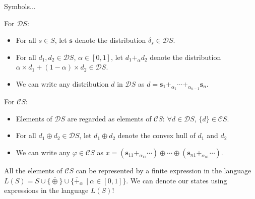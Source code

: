 \documentclass{beamer}
\newcommand{\C}{\mathcal C}
\begin{document}
\begin{frame}{Symbols...}
 \begin{block}{For $\mathcal D S$:}
\begin{itemize}
    \item For all $s \in S$, let $\mathbf s$ denote the distribution $\delta_s \in \mathcal D S$.  \pause
    \item For all $d_1, d_2 \in \mathcal D S$, $\alpha \in [0,1]$, let $d_1 +_\alpha d_2$ denote the distribution $\alpha \times d_1 + (1-\alpha) \times d_2 \in \mathcal D S$. \pause %
    \item[\MVRightarrow] We can write any distribution $d$ in $\mathcal D S$ as $d = \mathbf s_1 +_{\alpha_1} \cdots +_{\alpha_{n-1}} \mathbf s_n$. \pause
    \end{itemize}
    \end{block}
    
    \begin{block}{For $\C S$:}
    \begin{itemize}
    \item Elements of $\mathcal D S$ are regarded as elements of $\mathcal C S$: $\forall d \in \mathcal DS$, $\{d\} \in \mathcal CS$.\pause
    \item For all $d_1 \oplus d_2 \in \mathcal D S$, let $d_1 \oplus d_2$ denote the convex hull of $d_1$ and $d_2$ \pause
    \item[\MVRightarrow] We can write any $\varphi \in \C S$ as $x = (\mathbf s_{11} +_{\alpha_{11}} \cdots) \oplus \cdots \oplus (\mathbf s_{n1} +_{\alpha_{n1}} \cdots)$. \pause
    
\end{itemize}
\end{block}

All the elements of $\C S$ can be represented by a finite expression in the language $L(S) = S \cup \{ \overline \oplus \} \cup \{\overline +_\alpha\ \ | \ \alpha \in [0,1]\}$. We can denote our states using expressions in the language $L(S)$!

\end{frame}
\end{document}

